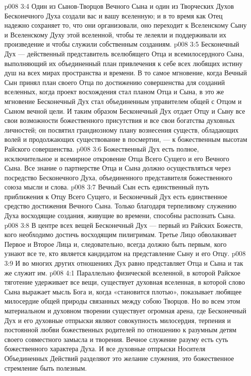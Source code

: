\vs p008 3:4 Один из Сынов\hyp{}Творцов Вечного Сына и один из Творческих Духов Бесконечного Духа создали вас и вашу вселенную; и в то время как Отец надежно сохраняет то, что они организовали, оно переходит к Вселенскому Сыну и Вселенскому Духу этой вселенной, чтобы те лелеяли и поддерживали их произведение и чтобы служили собственным созданиям.
\vs p008 3:5 \pc Бесконечный Дух --- действенный представитель вселюбящего Отца и всемилосердного Сына, выполняющий их объединенный план привлечения к себе всех любящих истину душ на всех мирах пространства и времени. В то самое мгновение, когда Вечный Сын принял план своего Отца по достижению совершенства для созданий вселенных, когда проект восхождения стал планом Отца и Сына, в это же мгновение Бесконечный Дух стал объединенным управителем общей с Отцом и Сыном вечной цели. И таким образом Бесконечный Дух отдает Отцу и Сыну все свои возможности божественного присутствия и все свои богатства духовных личностей; он посвятил  грандиозному плану вознесения существ, обладающих волей и продолжающих существование в посмертии, --- к божественным высотам Райского совершенства.
\vs p008 3:6 Божественный Дух есть полное, исключительное и всемирное откровение Отца Всего Сущего и его Вечного Сына. Все знание о партнерстве Отца и Сына должно осуществляться через посредство Бесконечного Духа, объединенного представителя божественного союза мысли и слова.
\vs p008 3:7 Вечный Сын есть единственный путь приближения к Отцу Всего Сущего, и Бесконечный Дух есть единственное средство достижения Вечного Сына. Только благодаря терпеливому служению Духа восходящие создания, живущие во времени, способны распознать Сына.
\vs p008 3:8 В центре всех вещей Бесконечный Дух --- первый из Райских Божеств, кого необходимо достичь восходящим пилигримам. Третье Лицо обволакивает Первое и Второе Лица и, следовательно, всегда должно быть первым, кого узнают все те, кто является кандидатом на представление Сыну и его Отцу.
\vs p008 3:9 И во многих других отношениях Дух равно представляет Отца и Сына и так же служит им.
\vs p008 4:1 Параллельно физической вселенной, в которой Райское тяготение удерживает все вещи, существует духовная вселенная, в которой слово Сына выражает мысль Бога и, когда «становится плотью», показывает любящее милосердие общей природы связанных между собою Творцов. Но во всем этом материальном и духовном творении существует огромная арена, где Бесконечный Дух и его духовные отпрыски являют совокупность милосердия, терпения и постоянной любви божественных родителей по отношению к разумным детям своего совместного замысла и творения. Вечное служение разуму есть суть божественного характера Духа. И все духовные отпрыски Носителя Объединенных Действий разделяют это желание служения, это божественное стремление быть полезным.
